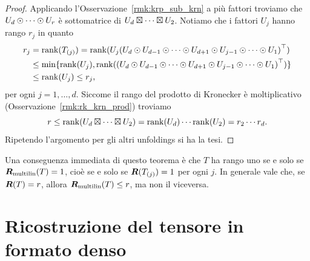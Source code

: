 \begin{proof}
	Applicando l'Osservazione~\ref{rmk:krp_sub_krn} a più fattori troviamo che $ U_d \mathbin{\odot} \cdots \mathbin{\odot} U_r $ è
	sottomatrice di $ U_d \mathbin{\boxtimes} \cdots \mathbin{\boxtimes} U_2 $. Notiamo che i fattori $ U_{j} $ hanno rango $ r_{j}
	$ in quanto
	\begin{equation*}
		\begin{aligned}
			r_{j} & = \rank(\Tm{T}{j}) = \rank(U_{j}\left( U_{d} \krp U_{d-1} \krp \cdots \krp
			U_{d+1} \krp U_{j-1} \krp \cdots \krp U_{1} \right)^{\top})                        \\
			      & \le \min \{\rank(U_{j}), \rank(\left( U_{d} \krp U_{d-1} \krp \cdots \krp
			U_{d+1} \krp U_{j-1} \krp \cdots \krp U_{1} \right)^{\top})\}                      \\
			      & \le \rank(U_{j}) \le r_{j},
		\end{aligned}
	\end{equation*}
	per ogni $ j = 1, \ldots, d $.
	Siccome il rango del prodotto di Kronecker è
	moltiplicativo (Osservazione~\ref{rmk:rk_krn_prod}) troviamo
	\begin{equation*}
		r \le \rank \left(U_d \krn \cdots \krn U_2 \right) = \rank (U_{d}) \cdots \rank(U_{2}) = r_2 \cdots r_d.
	\end{equation*}
	Ripetendo l'argomento per gli altri unfoldings si ha la tesi.
\end{proof}

\begin{remark}
	Una conseguenza immediata di questo teorema è che $ T $ ha rango uno se e solo se $ \bm{R}_{\text{multilin}}(T) =
		1$, cioè se e solo se $ \rk(\Tm{T}{j}) = 1 $ per ogni $ j $.
	In generale vale che, se $ \bm{R}(T) = r $, allora $ \bm{R}_{\text{multilin}}(T) \le r $, ma non il
	viceversa.

\end{remark}


\section{Ricostruzione del tensore in formato denso}

